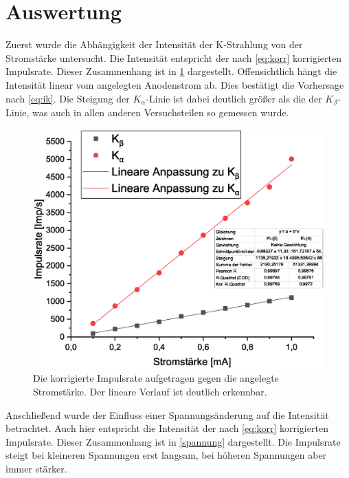 \documentclass[
	a4paper,
	12pt,
	pagesize,
	ngerman
]{scrartcl}
\begin{document}
\section{Auswertung}
Zuerst wurde die Abhängigkeit der Intensität der K-Strahlung von der Stromstärke untersucht. Die Intensität entspricht der nach \cref{eq:korr} korrigierten Impulsrate. Dieser Zusammenhang ist in \cref{strom} dargestellt. Offensichtlich hängt die Intensität linear vom angelegten Anodenstrom ab. Dies bestätigt die Vorhersage nach \cref{eq:ik}. Die Steigung der $K_\alpha$-Linie ist dabei deutlich größer als die der $K_\beta$-Linie, was auch in allen anderen Versuchsteilen so gemessen wurde.

\begin{figure}[h!]
	\centering
	\includegraphics[scale = 0.6]{strom.eps}
	\caption{Die korrigierte Impulsrate aufgetragen gegen die angelegte Stromstärke. Der lineare Verlauf ist deutlich erkennbar.}
	\label{strom}
\end{figure}

Anschließend wurde der Einfluss einer Spannungsänderung auf die Intensität betrachtet. Auch hier entspricht die Intensität der nach \cref{eq:korr} korrigierten Impulsrate. Dieser Zusammenhang ist in \cref{spannung} dargestellt. Die Impulsrate steigt bei kleineren Spannungen erst langsam, bei höheren Spannungen aber immer stärker.
\end{document}
